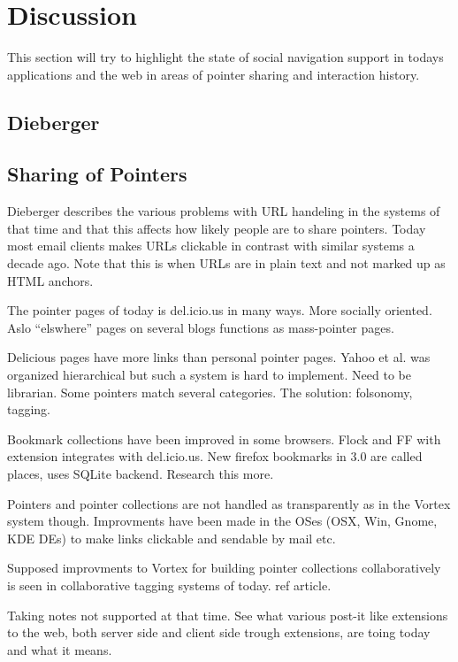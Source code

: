 \documentclass[12pt,a4paper]{article}
\begin{document}
\section{Discussion}

This section will try to highlight the state of social navigation support in
todays applications and the web in areas of pointer sharing and interaction
history.

\subsection{Dieberger}

\subsection{Sharing of Pointers}

Dieberger describes the various problems with URL handeling in the systems of
that time and that this affects how likely people are to share pointers. Today
most email clients makes URLs clickable in contrast with similar systems a
decade ago. Note that this is when URLs are in plain text and not marked up as
HTML anchors.



The pointer pages of today is del.icio.us in many ways. More socially
oriented. Aslo ``elswhere'' pages on several blogs functions as mass-pointer
pages.

Delicious pages have more links than personal pointer pages. Yahoo et al. was
organized hierarchical but such a system is hard to implement. Need to be
librarian. Some pointers match several categories. The solution: folsonomy,
tagging.

Bookmark collections have been improved in some browsers. Flock and FF with
extension integrates with del.icio.us. New firefox bookmarks in 3.0 are called
places, uses SQLite backend. Research this more.

Pointers and pointer collections are not handled as transparently as in the
Vortex system though. Improvments have been made in the OSes (OSX, Win, Gnome,
KDE DEs) to make links clickable and sendable by mail etc.

Supposed improvments to Vortex for building pointer collections
collaboratively is seen in collaborative tagging systems of today. ref
article.

Taking notes not supported at that time. See what various post-it like
extensions to the web, both server side and client side trough extensions, are
toing today and what it means.
\end{document}
